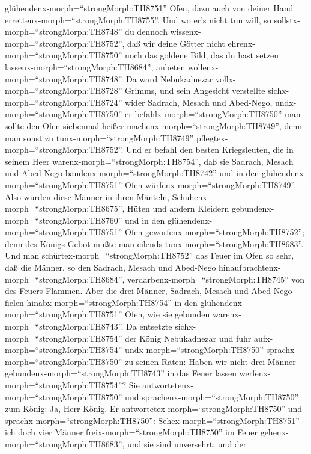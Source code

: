 glühendenx-morph=``strongMorph:TH8751'' Ofen, dazu auch von deiner Hand
errettenx-morph=``strongMorph:TH8755''.  Und wo er's nicht
tun will, so sollstx-morph=``strongMorph:TH8748'' du dennoch
wissenx-morph=``strongMorph:TH8752'', daß wir deine Götter nicht
ehrenx-morph=``strongMorph:TH8750'' noch das goldene Bild, das du hast
setzen lassenx-morph=``strongMorph:TH8684'', anbeten
wollenx-morph=``strongMorph:TH8748''.  Da ward Nebukadnezar
vollx-morph=``strongMorph:TH8728'' Grimms, und sein Angesicht verstellte
sichx-morph=``strongMorph:TH8724'' wider Sadrach, Mesach und Abed-Nego,
undx-morph=``strongMorph:TH8750'' er
befahlx-morph=``strongMorph:TH8750'' man sollte den Ofen siebenmal
heißer machenx-morph=``strongMorph:TH8749'', denn man sonst zu
tunx-morph=``strongMorph:TH8749'' pflegtex-morph=``strongMorph:TH8752''.
 Und er befahl den besten Kriegsleuten, die in seinem Heer
warenx-morph=``strongMorph:TH8754'', daß sie Sadrach, Mesach und
Abed-Nego bändenx-morph=``strongMorph:TH8742'' und in den
glühendenx-morph=``strongMorph:TH8751'' Ofen
würfenx-morph=``strongMorph:TH8749''.  Also wurden diese
Männer in ihren Mänteln, Schuhenx-morph=``strongMorph:TH8675'', Hüten
und andern Kleidern gebundenx-morph=``strongMorph:TH8760'' und in den
glühendenx-morph=``strongMorph:TH8751'' Ofen
geworfenx-morph=``strongMorph:TH8752'';  denn des Königs
Gebot mußte man eilends tunx-morph=``strongMorph:TH8683''. Und man
schürtex-morph=``strongMorph:TH8752'' das Feuer im Ofen so sehr, daß die
Männer, so den Sadrach, Mesach und Abed-Nego
hinaufbrachtenx-morph=``strongMorph:TH8684'',
verdarbenx-morph=``strongMorph:TH8745'' von des Feuers Flammen.
 Aber die drei Männer, Sadrach, Mesach und Abed-Nego fielen
hinabx-morph=``strongMorph:TH8754'' in den
glühendenx-morph=``strongMorph:TH8751'' Ofen, wie sie gebunden
warenx-morph=``strongMorph:TH8743''.  Da entsetzte
sichx-morph=``strongMorph:TH8754'' der König Nebukadnezar und fuhr
aufx-morph=``strongMorph:TH8754'' undx-morph=``strongMorph:TH8750''
sprachx-morph=``strongMorph:TH8750'' zu seinen Räten: Haben wir nicht
drei Männer gebundenx-morph=``strongMorph:TH8743'' in das Feuer lassen
werfenx-morph=``strongMorph:TH8754''? Sie
antwortetenx-morph=``strongMorph:TH8750'' und
sprachenx-morph=``strongMorph:TH8750'' zum König: Ja, Herr König.
 Er antwortetex-morph=``strongMorph:TH8750'' und
sprachx-morph=``strongMorph:TH8750'': Sehex-morph=``strongMorph:TH8751''
ich doch vier Männer freix-morph=``strongMorph:TH8750'' im Feuer
gehenx-morph=``strongMorph:TH8683'', und sie sind unversehrt; und der
